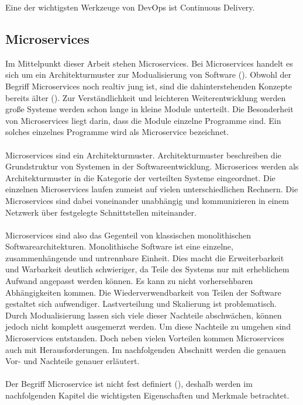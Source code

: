 Eine der wichtigsten Werkzeuge von DevOps ist Continuous Delivery.

\subsection{Microservices}

Im Mittelpunkt dieser Arbeit stehen Microservices. Bei Microservices handelt es sich um ein Architekturmuster zur Modualisierung von Software (\cite[S. 15]{newmanMicroservices2015}). Obwohl der Begriff Microservices noch realtiv jung ist, sind die dahinterstehenden Konzepte bereits älter (\cite[S. 15]{newmanMicroservices2015}). Zur Verständlichkeit und leichteren Weiterentwicklung werden große Systeme werden schon lange in kleine Module unterteilt. Die Besonderheit von Microservices liegt darin, dass die Module einzelne Programme sind. Ein solches einzelnes Programme wird als Microservice bezeichnet. \\
\\
Microservices sind ein Architekturmuster. Architekturmuster beschreiben die Grundstruktur von Systemen in der Softwareentwicklung. Microserices werden als Architekturmuster in die Kategorie der verteilten Systeme eingeordnet. Die einzelnen Microservices laufen zumeist auf vielen unterschiedlichen Rechnern. Die Microservices sind dabei voneinander unabhängig und kommunizieren in einem Netzwerk über festgelegte Schnittstellen miteinander. \\
\\
Microservices sind also das Gegenteil von klassischen monolithischen Softwarearchitekturen. Monolithische Software ist eine einzelne, zusammenhängende und untrennbare Einheit. Dies macht die Erweiterbarkeit und Warbarkeit deutlich schwieriger, da Teile des Systems nur mit erheblichem Aufwand angepasst werden können. Es kann zu nicht vorhersehbaren Abhängigkeiten kommen. Die Wiederverwendbarkeit von Teilen der Software gestaltet sich aufwendiger. Lastverteilung und Skalierung ist problematisch. Durch Modualisierung lassen sich viele dieser Nachteile abschwächen, können jedoch nicht komplett ausgemerzt werden. Um diese Nachteile zu umgehen sind Microservices entstanden. Doch neben vielen Vorteilen kommen Microservices auch mit Herausforderungen. Im nachfolgenden Abschnitt werden die genauen Vor- und Nachteile genauer erläutert. \\
\\
Der Begriff Microservice ist nicht fest definiert (\cite[S. 2]{wolffMicroservices2018}), deshalb werden im nachfolgenden Kapitel die wichtigsten Eigenschaften und Merkmale betrachtet.
